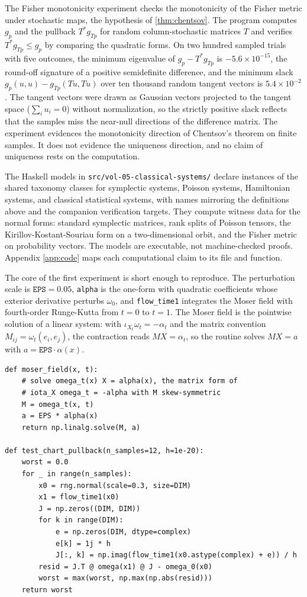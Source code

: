 \documentclass[11pt,letterpaper]{article}
\theoremstyle{definition}
\theoremstyle{remark}
\begin{document}
The Fisher monotonicity experiment checks the monotonicity of the Fisher metric under stochastic maps, the hypothesis of \cref{thm:chentsov}. The program computes $g_p$ and the pullback $T^{*} g_{Tp}$ for random column-stochastic matrices $T$ and verifies $T^{*} g_{Tp} \leq g_{p}$ by comparing the quadratic forms. On two hundred sampled trials with five outcomes, the minimum eigenvalue of $g_p - T^{*} g_{Tp}$ is $-5.6 \times 10^{-15}$, the round-off signature of a positive semidefinite difference, and the minimum slack $g_p(u, u) - g_{Tp}(Tu, Tu)$ over ten thousand random tangent vectors is $5.4 \times 10^{-2}$. The tangent vectors were drawn as Gaussian vectors projected to the tangent space ($\sum_i u_i = 0$) without normalization, so the strictly positive slack reflects that the samples miss the near-null directions of the difference matrix. The experiment evidences the monotonicity direction of Chentsov's theorem on finite samples. It does not evidence the uniqueness direction, and no claim of uniqueness rests on the computation.

The Haskell models in \texttt{src/vol-05-classical-systems/} declare instances of the shared taxonomy classes for symplectic systems, Poisson systems, Hamiltonian systems, and classical statistical systems, with names mirroring the definitions above and the companion verification targets. They compute witness data for the normal forms: standard symplectic matrices, rank splits of Poisson tensors, the Kirillov-Kostant-Souriau form on a two-dimensional orbit, and the Fisher metric on probability vectors. The models are executable, not machine-checked proofs. Appendix \ref{app:code} maps each computational claim to its file and function.

The core of the first experiment is short enough to reproduce. The perturbation scale is $\texttt{EPS} = 0.05$, \texttt{alpha} is the one-form with quadratic coefficients whose exterior derivative perturbs $\omega_0$, and \texttt{flow\_time1} integrates the Moser field with fourth-order Runge-Kutta from $t = 0$ to $t = 1$. The Moser field is the pointwise solution of a linear system: with $\iota_{X_t} \omega_t = -\alpha_t$ and the matrix convention $M_{ij} = \omega_t(e_i, e_j)$, the contraction reads $M X = \alpha_t$, so the routine solves $M X = a$ with $a = \texttt{EPS} \cdot \alpha(x)$.

\begin{lstlisting}[caption={Core of the Darboux chart experiment (darboux\_chart.py).},label=lst:darboux]
def moser_field(x, t):
    # solve omega_t(x) X = alpha(x), the matrix form of
    # iota_X omega_t = -alpha with M skew-symmetric
    M = omega_t(x, t)
    a = EPS * alpha(x)
    return np.linalg.solve(M, a)

def test_chart_pullback(n_samples=12, h=1e-20):
    worst = 0.0
    for _ in range(n_samples):
        x0 = rng.normal(scale=0.3, size=DIM)
        x1 = flow_time1(x0)
        J = np.zeros((DIM, DIM))
        for k in range(DIM):
            e = np.zeros(DIM, dtype=complex)
            e[k] = 1j * h
            J[:, k] = np.imag(flow_time1(x0.astype(complex) + e)) / h
        resid = J.T @ omega(x1) @ J - omega_0(x0)
        worst = max(worst, np.max(np.abs(resid)))
    return worst
\end{lstlisting}
\end{document}
